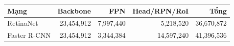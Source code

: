 \begin{tabular}{lrrrr}
\toprule
Mạng & Backbone & FPN & Head/RPN/RoI & Tổng\\
\midrule
RetinaNet & 23,454,912 & 7,997,440 & 5,218,520 & 36,670,872\\
Faster R-CNN & 23,454,912 & 3,344,384 & 14,597,240 & 41,396,536\\
\bottomrule
\end{tabular}
